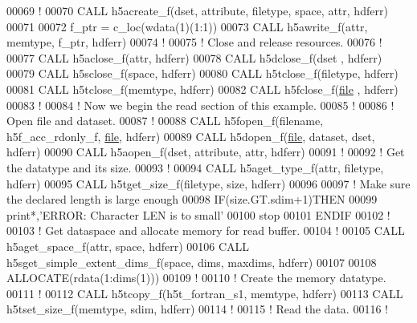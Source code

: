 \begin{DoxyCode}
00069   \textcolor{comment}{!}
00070   \textcolor{keyword}{CALL }h5acreate\_f(dset, attribute, filetype, space, attr, hdferr)
00071 
00072   f\_ptr = c\_loc(wdata(1)(1:1))
00073   \textcolor{keyword}{CALL }h5awrite\_f(attr, memtype, f\_ptr, hdferr)
00074   \textcolor{comment}{!}
00075   \textcolor{comment}{! Close and release resources.}
00076   \textcolor{comment}{!}
00077   \textcolor{keyword}{CALL }h5aclose\_f(attr, hdferr)
00078   \textcolor{keyword}{CALL }h5dclose\_f(dset , hdferr)
00079   \textcolor{keyword}{CALL }h5sclose\_f(space, hdferr)
00080   \textcolor{keyword}{CALL }h5tclose\_f(filetype, hdferr)
00081   \textcolor{keyword}{CALL }h5tclose\_f(memtype, hdferr)
00082   \textcolor{keyword}{CALL }h5fclose\_f(\hyperlink{structfile}{file} , hdferr)
00083   \textcolor{comment}{!}
00084   \textcolor{comment}{! Now we begin the read section of this example.}
00085   \textcolor{comment}{!}
00086   \textcolor{comment}{! Open file and dataset.}
00087   \textcolor{comment}{!}
00088   \textcolor{keyword}{CALL }h5fopen\_f(filename, h5f\_acc\_rdonly\_f, \hyperlink{structfile}{file}, hdferr)
00089   \textcolor{keyword}{CALL }h5dopen\_f(\hyperlink{structfile}{file}, dataset, dset, hdferr)
00090   \textcolor{keyword}{CALL }h5aopen\_f(dset, attribute, attr, hdferr)
00091   \textcolor{comment}{!}
00092   \textcolor{comment}{! Get the datatype and its size.}
00093   \textcolor{comment}{!}
00094   \textcolor{keyword}{CALL }h5aget\_type\_f(attr, filetype, hdferr)
00095   \textcolor{keyword}{CALL }h5tget\_size\_f(filetype, \textcolor{keyword}{size}, hdferr)
00096 
00097   \textcolor{comment}{! Make sure the declared length is large enough}
00098   \textcolor{keywordflow}{IF}(size.GT.sdim+1)\textcolor{keywordflow}{THEN}
00099      print*,\textcolor{stringliteral}{'ERROR: Character LEN is to small'}
00100      stop
00101 \textcolor{keywordflow}{  ENDIF}
00102   \textcolor{comment}{!}
00103   \textcolor{comment}{! Get dataspace and allocate memory for read buffer.}
00104   \textcolor{comment}{! }
00105   \textcolor{keyword}{CALL }h5aget\_space\_f(attr, space, hdferr)
00106   \textcolor{keyword}{CALL }h5sget\_simple\_extent\_dims\_f(space, dims, maxdims, hdferr)
00107 
00108   \textcolor{keyword}{ALLOCATE}(rdata(1:dims(1)))
00109   \textcolor{comment}{!}
00110   \textcolor{comment}{! Create the memory datatype.}
00111   \textcolor{comment}{!}
00112   \textcolor{keyword}{CALL }h5tcopy\_f(h5t\_fortran\_s1, memtype, hdferr)
00113   \textcolor{keyword}{CALL }h5tset\_size\_f(memtype, sdim, hdferr)
00114   \textcolor{comment}{!}
00115   \textcolor{comment}{! Read the data.}
00116   \textcolor{comment}{!}

\end{DoxyCode}

